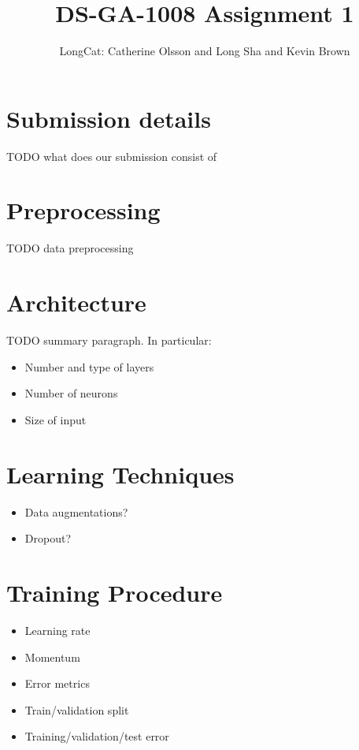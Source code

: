 \documentclass{article}
\title{DS-GA-1008 Assignment 1}
\author{LongCat: Catherine Olsson and Long Sha and Kevin Brown}
\begin{document}
\maketitle


\section{Submission details}

TODO what does our submission consist of

\section{Preprocessing}

TODO data preprocessing

\section{Architecture}

TODO summary paragraph. In particular:
\begin{itemize}
\item Number and type of layers
\item Number of neurons
\item Size of input
\end{itemize}

\section{Learning Techniques}
\begin{itemize}
\item Data augmentations?
\item Dropout?
\end{itemize}

\section{Training Procedure}
\begin{itemize}
\item Learning rate
\item Momentum
\item Error metrics
\item Train/validation split
\item Training/validation/test error
\end{itemize}
\end{document}
